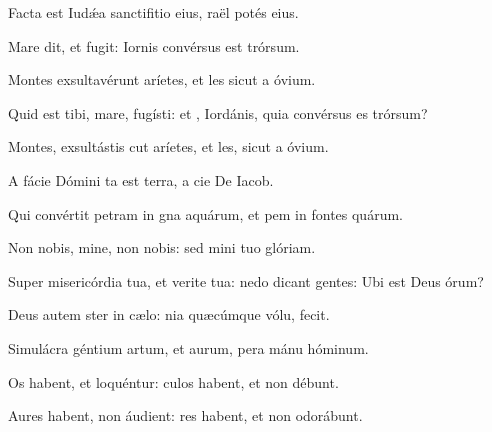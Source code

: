 \item {}

\item Facta est Iudǽa sanctifitio eius,\psstar{} raël potés eius.

\item Mare dit, et fugit:\psstar{} Iornis convérsus est trórsum.

\item Montes exsultavérunt  aríetes,\psstar{} et les sicut a óvium.

\item Quid est tibi, mare,  fugísti:\psstar{} et , Iordánis, quia convérsus es trórsum?

\item Montes, exsultástis cut aríetes,\psstar{} et les, sicut a óvium.

\item A fácie Dómini ta est terra,\psstar{} a cie De Iacob.

\item Qui convértit petram in gna aquárum,\psstar{} et pem in fontes quárum.

\item Non nobis, mine, non nobis:\psstar{} sed mini tuo  glóriam.

\item Super misericórdia tua, et verite tua:\psstar{} nedo dicant gentes: Ubi est Deus órum?

\item Deus autem ster in cælo:\psstar{} nia quæcúmque vólu, fecit.

\item Simulácra géntium artum, et aurum,\psstar{} pera mánu hóminum.

\item Os habent, et  loquéntur:\psstar{} culos habent, et non débunt.

\item Aures habent,  non áudient:\psstar{} res habent, et non odorábunt.

